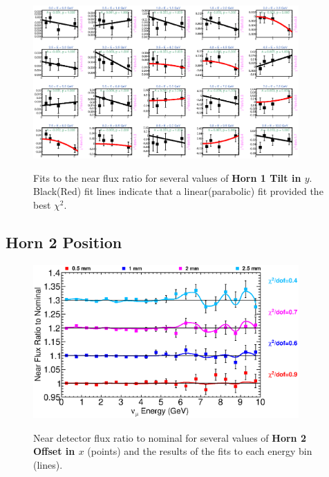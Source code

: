 \begin{figure}[hb]
  \begin{center}
    {\includegraphics[width=4.0in]{figures/Horn1YTilt_near_fits.eps}}
  \end{center}
\caption{ Fits to the near flux ratio for several values of {\bf Horn 1 Tilt in $y$}. Black(Red) fit lines indicate that a linear(parabolic) fit provided the best $\chi^2$. }
\end{figure}

\clearpage
\subsection{Horn 2 Position}

\begin{figure}[ht]
  \begin{center}
    {\includegraphics[width=4.0in]{figures/Horn2XOffset_near_summary.eps}}
  \end{center}
\caption{ Near detector flux ratio to nominal for several values of {\bf Horn 2 Offset in $x$} (points) and the results of the fits to each energy bin (lines).}
\end{figure}


